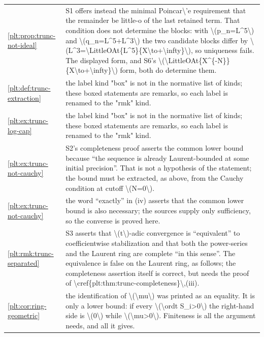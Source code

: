 \documentclass[11pt,oneside]{article}
\theoremstyle{plain}
\theoremstyle{definition}
\theoremstyle{remark}
\begin{document}
\begin{longtable}{@{}p{} p{}@{}}
\cref{plt:prop:trunc-not-ideal} & S1 offers instead the minimal Poincar\textbackslash 'e requirement that the remainder be little-o of the last retained term. That condition does not determine the blocks: with \textbackslash (p\_n=L\textasciicircum 5\textbackslash ) and \textbackslash (q\_n=L\textasciicircum 5+L\textasciicircum 3\textbackslash ) the two candidate blocks differ by \textbackslash (L\textasciicircum 3=\textbackslash LittleOAt\{L\textasciicircum 5\}\{X\textbackslash to+\textbackslash infty\}\textbackslash ), so uniqueness fails. The displayed form, and S6's \textbackslash (\textbackslash LittleOAt\{X\textasciicircum \{-N\}\}\{X\textbackslash to+\textbackslash infty\}\textbackslash ) form, both do determine them.\\
\cref{plt:def:trunc-extraction} & the label kind "box" is not in the normative list of kinds; these boxed statements are remarks, so each label is renamed to the "rmk" kind.\\
\cref{plt:ex:trunc-log-cap} & the label kind "box" is not in the normative list of kinds; these boxed statements are remarks, so each label is renamed to the "rmk" kind.\\
\cref{plt:ex:trunc-not-cauchy} & S2's completeness proof asserts the common lower bound because ``the sequence is already Laurent-bounded at some initial precision''. That is not a hypothesis of the statement; the bound must be extracted, as above, from the Cauchy condition at cutoff \textbackslash (N=0\textbackslash ).\\
\cref{plt:ex:trunc-not-cauchy} & the word ``exactly'' in (iv) asserts that the common lower bound is also necessary; the sources supply only sufficiency, so the converse is proved here.\\
\cref{plt:rmk:trunc-separated} & S3 asserts that \textbackslash (t\textbackslash )-adic convergence is ``equivalent'' to coefficientwise stabilization and that both the power-series and the Laurent ring are complete ``in this sense''. The equivalence is false on the Laurent ring, as follows; the completeness assertion itself is correct, but needs the proof of \textbackslash cref\{plt:thm:trunc-completeness\}\textbackslash ,(iii).\\
\cref{plt:cor:ring-geometric} & the identification of \textbackslash (\textbackslash mu\textbackslash ) was printed as an equality. It is only a lower bound: if every \textbackslash (\textbackslash ordt S\_i>0\textbackslash ) the right-hand side is \textbackslash (0\textbackslash ) while \textbackslash (\textbackslash mu>0\textbackslash ). Finiteness is all the argument needs, and all it gives.\\

\end{longtable}
\end{document}
